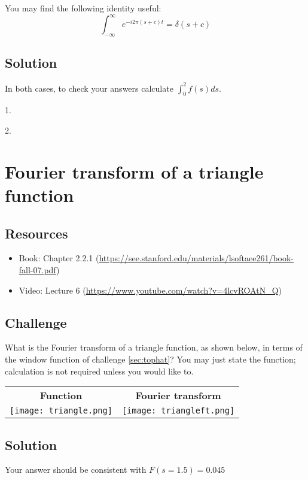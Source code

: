 You may find the following identity useful:
\begin{equation}
    \int_{-\infty}^{\infty} e^{-i 2 \pi (s+c) t} = \delta(s+c)
\end{equation}

\subsection*{Solution}
In both cases, to check your answers calculate $\int_0^2 f(s) ds$.

1.\\

2.\\




\newpage
\section{Fourier transform of a triangle function}
\label{sec:ft_triangle}

\subsection*{Resources}
\begin{itemize}
    \item Book: Chapter 2.2.1 (\url{https://see.stanford.edu/materials/lsoftaee261/book-fall-07.pdf})
    \item Video: Lecture 6 (\url{https://www.youtube.com/watch?v=4lcvROAtN_Q})
\end{itemize}

\subsection*{Challenge}
What is the Fourier transform of a triangle function, as shown below, in terms of the window function of challenge \ref{sec:tophat}? You may just state the function; calculation is not required unless you would like to.

\begin{tabular}{cc}
    \textbf{Function} & \textbf{Fourier transform} \\
    \texttt{[image: triangle.png]} & \texttt{[image: triangleft.png]}
\end{tabular}

\subsection*{Solution}
Your answer should be consistent with $F(s=1.5) = 0.045$




